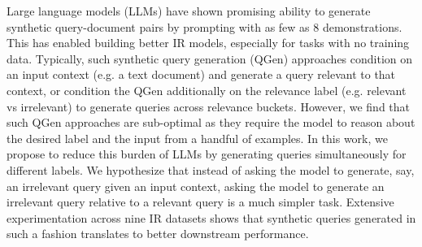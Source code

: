 Large language models (LLMs) have shown promising ability to generate synthetic query-document pairs by prompting with as few as 8 demonstrations. This has enabled building better IR models, especially for tasks with no training data. Typically, such synthetic query generation (QGen) approaches condition on an input context (e.g. a text document) and generate a query relevant to that context, or condition the QGen additionally on the relevance label (e.g. relevant vs irrelevant) to generate queries across relevance buckets. However, we find that such QGen approaches are sub-optimal as they require the model to reason about the desired label and the input from  a handful of examples. In this work, we propose to reduce this burden of LLMs by generating queries simultaneously for different labels.   We hypothesize that instead of asking the model to generate, say, an irrelevant query given an input context, asking the model to generate an irrelevant query relative to a relevant query is a much simpler task. Extensive experimentation across nine IR datasets shows that synthetic queries generated in such a fashion translates to better downstream performance.